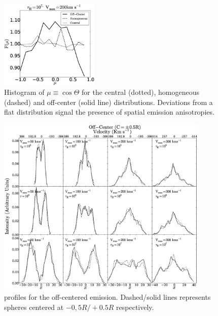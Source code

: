 \documentclass{emulateapj}
\newcommand{\ly}{{\ifmmode{{\rm Ly}\alpha~}\else{Ly$\alpha$~}\fi}}
\begin{document}
\begin{figure}
  \includegraphics[width=0.42\textwidth]{f9.eps}
  \caption{Histogram of $\mu\equiv\cos\Theta$ for the 
    central (dotted), homogeneous (dashed) and off-center (solid
    line) distributions. Deviations from a flat distribution signal the presence of
    spatial emission anisotropies. 
    \label{fig:muhisto}} 
\end{figure}

\begin{figure}
\begin{center}
\includegraphics[width=0.90\textwidth]{f10.eps}
\end{center}
\caption{\ly profiles for the off-centered emission. Dashed/solid
  lines represents spheres centered at $-0,5R/+0.5R$ respectively.
   \label{fig:OC_profiles}} 
\end{figure}
\end{document}
